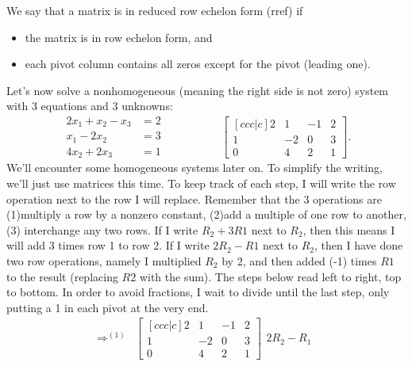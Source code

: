 \begin{example}
\begin{definition}
We say that a matrix is in reduced row echelon form (rref) if 
\begin{itemize}
\item the matrix is in row echelon form, and 
\item each pivot column contains all zeros except for the pivot (leading one).
\end{itemize}
\end{definition}


\end{example}


\begin{example}
Let's now solve a nonhomogeneous (meaning the right side is not zero) system with 3 equations and 3 unknowns: $$\begin{array}{rl}
2x_1+x_2-x_3&=2\\
x_1-2x_2 &=3\\
4x_2+2x_3&=1
\end{array} \quad\quad\quad\quad\quad
 \begin{bmatrix}[ccc|c] 2&1&-1&2\\1&-2&0&3\\0&4&2&1\end{bmatrix}.$$ 
We'll encounter some homogeneous systems later on.
To simplify the writing, we'll just use matrices this time. 
To keep track of each step, I will write the row operation next to the row I will replace. 
Remember that the 3 operations are (1)multiply a row by a nonzero constant, (2)add a multiple of one row to another, (3) interchange any two rows.  
If I write $R_2+3R1$ next to $R_2$, then this means I will add 3 times row 1 to row 2.  
If I write $2R_2-R1$ next to $R_2$, then I have done two row operations, namely I multiplied $R_2$ by 2, and then added (-1) times $R1$ to the result (replacing $R2$ with the sum). 
The steps below read left to right, top to bottom. 
In order to avoid fractions, I wait to divide until the last step, only putting a 1 in each pivot at the very end.
$$\begin{array}{rlcl}
\Rightarrow^{(1)}&
 \begin{bmatrix}[ccc|c] 2&1&-1&2\\1&-2&0&3\\0&4&2&1\end{bmatrix}
  \begin{array}{lr} \ \\2R_2-R_1\\ \ \end{array}

\end{array}$$
\end{example}
